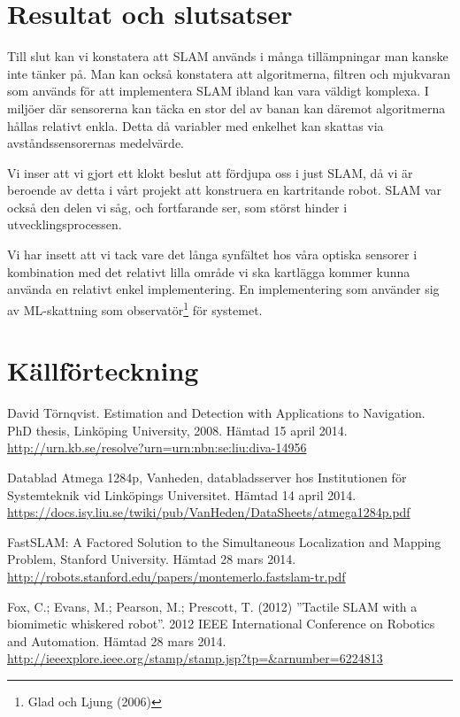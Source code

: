 \documentclass[a4paper,12pt,fleqn]{article}
\begin{document}
\newpage
\section{Resultat och slutsatser}

Till slut kan vi konstatera att SLAM används i många tillämpningar man kanske inte tänker på. Man kan också konstatera att algoritmerna, filtren och mjukvaran som används för att implementera SLAM ibland kan vara väldigt komplexa. I miljöer där sensorerna kan täcka en stor del av banan kan däremot algoritmerna hållas relativt enkla. Detta då variabler med enkelhet kan skattas via avståndssensorernas medelvärde. 

Vi inser att vi gjort ett klokt beslut att fördjupa oss i just SLAM, då vi är beroende av detta i vårt projekt att konstruera en kartritande robot. SLAM var också den delen vi såg, och fortfarande ser, som störst hinder i utvecklingsprocessen. 

Vi har insett att vi tack vare det långa synfältet hos våra optiska sensorer i kombination med det relativt lilla område vi ska kartlägga kommer kunna använda en relativt enkel implementering. En implementering som använder sig av ML-skattning som observatör\footnote{Glad och Ljung (2006)} för systemet. 

\newpage 
\section*{Källförteckning} 

David Törnqvist. Estimation and Detection with Applications to Navigation. PhD thesis, Linköping University, 2008. Hämtad 15 april 2014.
\url{http://urn.kb.se/resolve?urn=urn:nbn:se:liu:diva-14956}

Datablad Atmega 1284p, Vanheden, databladsserver hos Institutionen för Systemteknik vid Linköpings Universitet. Hämtad 14 april 2014. \url{https://docs.isy.liu.se/twiki/pub/VanHeden/DataSheets/atmega1284p.pdf}

FastSLAM: A Factored Solution to the Simultaneous
Localization and Mapping Problem, Stanford University. Hämtad 28 mars 2014.
\url{http://robots.stanford.edu/papers/montemerlo.fastslam-tr.pdf}

Fox, C.; Evans, M.; Pearson, M.; Prescott, T. (2012)
''Tactile SLAM with a biomimetic whiskered robot''. 2012 IEEE International Conference on Robotics and Automation. Hämtad 28 mars 2014.
\url{http://ieeexplore.ieee.org/stamp/stamp.jsp?tp=&arnumber=6224813}
\end{document}
